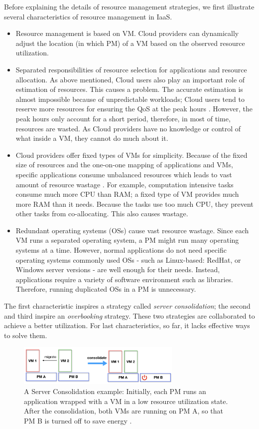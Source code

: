 Before explaining the details of resource management strategies, we first illustrate several characteristics of resource management in IaaS.
\begin{itemize}
	\item Resource management is based on VM. Cloud providers can dynamically adjust the location (in which PM) of a VM based on the observed resource utilization. 
	\item Separated responsibilities of resource selection for applications and resource allocation. 
	As above mentioned, Cloud users also play an important role of estimation of resources. This causes a problem. The accurate estimation is almost impossible because of unpredictable workloads; Cloud users tend to reserve more resources for ensuring the QoS at the peak hours \cite{Chaisiri:2012cv}. However, the peak hours only account for a short period, therefore, in most of time, resources are wasted. As Cloud providers have no knowledge or control of what inside a VM, they cannot do much about it.
	\item Cloud providers offer fixed types of VMs for simplicity. Because of the fixed size of resources and the one-on-one mapping of applications and VMs, specific applications consume unbalanced resources which leads to vast amount of resource wastage \cite{Tomas:2013iv}. For example, computation intensive tasks consume much more CPU than RAM; a fixed type of VM provides much more RAM than it needs. Because the tasks use too much CPU, they prevent other tasks from co-allocating. This also causes wastage. 
	\item Redundant operating systems (OSs) cause vast resource wastage. Since each VM runs a separated operating system, a PM might run many operating systems at a time. However, normal applications do not need specific operating systems commonly used OSs - such as Linux-based: RedHat, or Windows server versions - are well enough for their needs. Instead, applications require a variety of software environment such as libraries. Therefore, running duplicated OSs in a PM is unnecessary.
\end{itemize}

 The first characteristic inspires a strategy called \emph{server consolidation}; the second and third inspire an \emph{overbooking} strategy. These two strategies are collaborated to achieve a better utilization. For last characteristics, so far, it lacks effective ways to solve them.

\begin{figure}
	\centering
	\includegraphics[width=0.7\textwidth]{pics/consolidate.png}
	\caption{A Server Consolidation example: Initially, each PM runs an application wrapped with a VM in a low resource utilization state. After the consolidation, both VMs are running on PM A, so that PM B is turned off to save energy \cite{Barroso:2007jt}.}
	\label{fig:consolidation}
\end{figure} 

